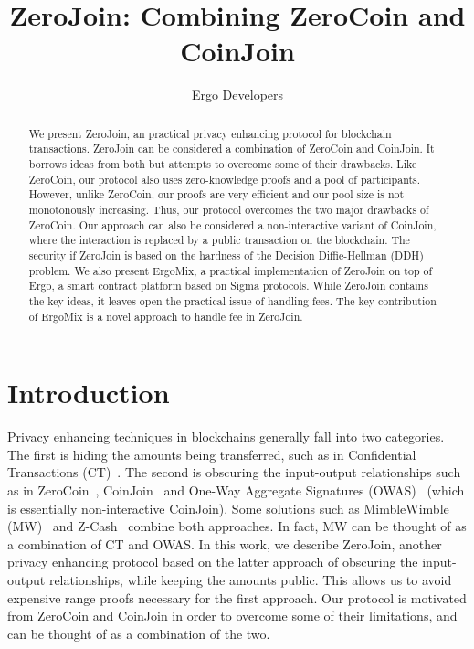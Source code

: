 \documentclass[11pt]{article}
\newcommand{\mixname}{ErgoMix\xspace}
\begin{document}
\newcommand{\algname}{ZeroJoin\xspace}
\title{\algname: Combining ZeroCoin and CoinJoin}
\author{Ergo Developers}
\maketitle

\begin{abstract}

We present \algname, an practical privacy enhancing protocol for blockchain transactions. \algname can be considered a combination of ZeroCoin and CoinJoin. It borrows ideas from both but attempts to overcome some of their drawbacks. 
Like ZeroCoin, our protocol also uses zero-knowledge proofs and a pool of
participants. However, unlike ZeroCoin, our proofs are very efficient and our pool size is not monotonously increasing. 
Thus, our protocol overcomes the two major drawbacks of ZeroCoin. Our approach can also be considered a non-interactive variant of CoinJoin, where the interaction is replaced by a public transaction on the blockchain. The security if \algname is based on the hardness of the Decision Diffie-Hellman (DDH) problem. 
We also present \mixname, a practical implementation of \algname on top of Ergo, a smart contract platform based on Sigma protocols. While \algname contains the key ideas, it leaves open the practical issue of handling fees. The key contribution of \mixname is a novel approach to handle fee in \algname. 

\end{abstract}

\section{Introduction}
\label{intro}

Privacy enhancing techniques in blockchains generally fall into two categories. The first is hiding the amounts being transferred, such as in Confidential Transactions (CT)~\cite{ct}. The second is obscuring the input-output relationships such as in ZeroCoin~\cite{zerocoin}, CoinJoin~\cite{coinjoin} and One-Way Aggregate Signatures (OWAS)~\cite{owas} (which is essentially non-interactive CoinJoin).
Some solutions such as MimbleWimble (MW)~\cite{mw} and Z-Cash~\cite{zcash,zcash1} combine both approaches. In fact, MW can be thought of as a combination of CT and OWAS. In this work, we describe \algname, another privacy enhancing protocol based on the latter approach of obscuring the input-output relationships, while keeping the amounts public. This allows us to avoid expensive range proofs necessary for the first approach. Our protocol is motivated from ZeroCoin and CoinJoin in order to overcome some of their limitations, and can be thought of as a combination of the two.
\end{document}
